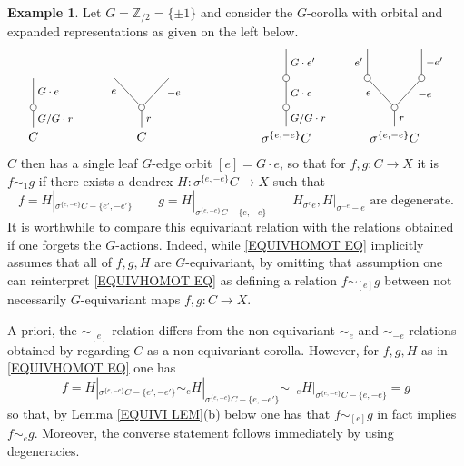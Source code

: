 \documentclass[a4paper,10pt
,draft
]{article}%
\numberwithin{equation}{section}
\numberwithin{figure}{section}
\theoremstyle{definition} %
\newtheorem{example}[equation]{Example}%
\newcommand{\1}{\ensuremath{\mathbbm 1}}%
\begin{document}
\begin{example}\label{EQUIVSIM EX}
	Let $G = \mathbb{Z}_{/2} = \{\pm 1\}$
	and consider the $G$-corolla with orbital and expanded representations as given on the left below.
\[
\begin{tikzpicture}
[grow=up,auto,level distance=2.3em,every node/.style = {font=\footnotesize},dummy/.style={circle,draw,inner sep=0pt,minimum size=1.75mm}]
	\node at (0,0) [font=\normalsize]{$C$}
		child{node [dummy] {}
			child{
			edge from parent node [swap] {$G \cdot e$}
node [name=Kone,swap] {}}
		edge from parent node [swap] {$G/G \cdot r$}
		};
	\node at (3,0) [font=\normalsize]{$C$}
		child{node [dummy] {}
			child{
			edge from parent node [swap,near end] {$-e$} node [name=Kn] {}}
			child{
			edge from parent node [near end] {$e$}
node [name=Kone,swap] {}}
		edge from parent node [swap] {$r$}
		};
	\node at (7,0) [font=\normalsize]{$\sigma^{\{e,-e\}} C$}
		child{node [dummy] {}
			child{node [dummy] {}
				child{
				edge from parent node [swap] {$G \cdot e'$}
node [swap] {}}
			edge from parent node [swap] {$G \cdot e$}
node [swap] {}}
		edge from parent node [swap] {$G/G \cdot r$}
		};
	\node at (10,0) [font=\normalsize]{$\sigma^{\{e,-e\}} C$}
		child{node [dummy] {}
			child{node [dummy] {}
				child{
				edge from parent node [swap] {$-e'$} node {}}
			edge from parent node [swap,near end] {$-e$} node {}}
			child{node [dummy] {}
				child{
				edge from parent node {$e'$}
node [swap] {}}
			edge from parent node [near end] {$e$}
node [swap] {}}
		edge from parent node [swap] {$r$}
		};
\end{tikzpicture}
\]
$C$ then has a single leaf $G$-edge orbit $[e] = G \cdot e$, so that for
$f,g \colon C \to X$ it is
$f \sim_1 g$
if there exists a dendrex
$H \colon \sigma^{\{e,-e\}}C \to X$
such that 
\begin{equation}\label{EQUIVHOMOT EQ}
	f = H|_{\sigma^{\{e,-e\}}C - \{e',-e'\}}
\qquad
	g = H|_{\sigma^{\{e,-e\}}C - \{e,-e\}}
\qquad
	H_{\sigma^e e}, H|_{\sigma^{-e}-e} \text{ are degenerate}.
\end{equation}
It is worthwhile to compare this equivariant relation with the relations obtained if one forgets the $G$-actions. Indeed, while \eqref{EQUIVHOMOT EQ} implicitly assumes that all of $f,g,H$ are $G$-equivariant,
by omitting that assumption one can reinterpret 
\eqref{EQUIVHOMOT EQ}
as defining a relation
$f \sim_{[e]} g$ between not necessarily $G$-equivariant maps $f,g \colon C \to X$.

A priori, the $\sim_{[e]}$ relation differs from the 
non-equivariant 
$\sim_{e}$ and $\sim_{-e}$
relations obtained by regarding $C$ as a non-equivariant corolla.
However, for $f,g,H$ as in \eqref{EQUIVHOMOT EQ} one has
\begin{equation}\label{EQUIVSIM EQ}
f = H|_{\sigma^{\{e,-e\}}C - \{e',-e'\}}
\sim_e H|_{\sigma^{\{e,-e\}}C - \{e,-e'\}}
\sim_{-e} H|_{\sigma^{\{e,-e\}}C - \{e,-e\}} =g
\end{equation}
so that, by Lemma \ref{EQUIVI LEM}(b) below one has that
$f \sim_{[e]} g$ in fact implies
$f \sim_{e} g$. Moreover, the converse statement follows immediately by using degeneracies.


\end{example}
\end{document}
